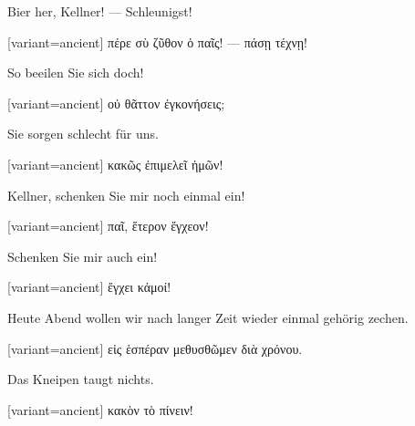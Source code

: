 Bier her, Kellner! --- Schleunigst!

\switchcolumn

\begin{greek}[variant=ancient]%
πέρε σὺ ζῦθον ὁ παῖς! --- πάσῃ τέχνῃ!

\end{greek}%
\switchcolumn*

So beeilen Sie sich doch!

\switchcolumn

\begin{greek}[variant=ancient]%
οὐ θᾶττον ἐγκονήσεις;

\end{greek}%
\switchcolumn*

Sie sorgen schlecht für uns.

\switchcolumn

\begin{greek}[variant=ancient]%
κακῶς ἐπιμελεῖ ἡμῶν!

\end{greek}%
\switchcolumn*

Kellner, schenken Sie mir noch einmal ein!

\switchcolumn

\begin{greek}[variant=ancient]%
παῖ, ἕτερον ἔγχεον!

\end{greek}%
\switchcolumn*

Schenken Sie mir auch ein!

\switchcolumn

\begin{greek}[variant=ancient]%
ἔγχει κἀμοί!

\end{greek}%
\switchcolumn*

Heute Abend wollen wir nach langer Zeit wieder einmal gehörig zechen.

\switchcolumn

\begin{greek}[variant=ancient]%
εἰς ἑσπέραν μεθυσθῶμεν διὰ χρόνου.

\end{greek}%
\switchcolumn*

Das Kneipen taugt nichts.

\switchcolumn

\begin{greek}[variant=ancient]%
κακὸν τὸ πίνειν!

\end{greek}%
\switchcolumn*


